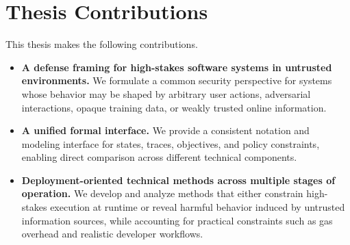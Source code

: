 \section{Thesis Contributions}

This thesis makes the following contributions.
\begin{itemize}
    \item \textbf{A defense framing for high-stakes software systems in untrusted environments.}
    We formulate a common security perspective for systems whose behavior may be shaped by arbitrary user actions,
    adversarial interactions, opaque training data, or weakly trusted online information.

    \item \textbf{A unified formal interface.}
    We provide a consistent notation and modeling interface for states, traces,
    objectives, and policy constraints, enabling direct comparison across
    different technical components.

    \item \textbf{Deployment-oriented technical methods across multiple stages of operation.}
    We develop and analyze methods that either constrain high-stakes execution at runtime
    or reveal harmful behavior induced by untrusted information sources,
    while accounting for practical constraints such as gas overhead and realistic developer workflows.
\end{itemize}
